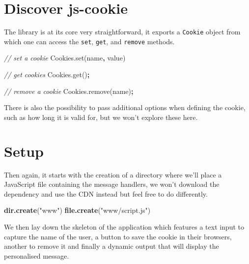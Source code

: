 \documentclass[
]{krantz}
\makeatletter
\newenvironment{Shaded}{\begin{snugshade}}{\end{snugshade}}
\newcommand{\AttributeTok}[1]{\textcolor[rgb]{0.61,0.61,0.61}{#1}}
\newcommand{\CommentTok}[1]{\textcolor[rgb]{0.37,0.37,0.37}{\textit{#1}}}
\newcommand{\KeywordTok}[1]{\textcolor[rgb]{0.27,0.27,0.27}{\textbf{#1}}}
\newcommand{\NormalTok}[1]{#1}
\newcommand{\OperatorTok}[1]{\textcolor[rgb]{0.43,0.43,0.43}{\textbf{#1}}}
\newcommand{\StringTok}[1]{\textcolor[rgb]{0.5,0.5,0.5}{#1}}
\newcommand{\VariableTok}[1]{\textcolor[rgb]{0,0,0}{#1}}
\newenvironment{kframe}{%
\medskip{}
\setlength{\fboxsep}{.8em}
 \def\at@end@of@kframe{}%
 \ifinner\ifhmode%
  \def\at@end@of@kframe{\end{minipage}}%
  \begin{minipage}{\columnwidth}%
 \fi\fi%
 \def\FrameCommand##1{\hskip\@totalleftmargin \hskip-\fboxsep
 \colorbox{shadecolor}{##1}\hskip-\fboxsep
     \hskip-\linewidth \hskip-\@totalleftmargin \hskip\columnwidth}%
 \MakeFramed {\advance\hsize-\width
   \@totalleftmargin\z@ \linewidth\hsize
   \@setminipage}}%
 {\par\unskip\endMakeFramed%
 \at@end@of@kframe}
\renewenvironment{Shaded}{\begin{kframe}}{\end{kframe}}
\makeatother
\begin{document}
\hypertarget{discover-js-cookie}{%
\section{Discover js-cookie}\label{discover-js-cookie}}

The library is at its core very straightforward, it exports a \texttt{Cookie} object from which one can access the \texttt{set}, \texttt{get}, and \texttt{remove} methods.

\begin{Shaded}
\begin{Highlighting}[]
\CommentTok{// set a cookie}
\VariableTok{Cookies}\NormalTok{.}\AttributeTok{set}\NormalTok{(}\StringTok{\textquotesingle{}name\textquotesingle{}}\OperatorTok{,} \StringTok{\textquotesingle{}value\textquotesingle{}}\NormalTok{)}

\CommentTok{// get cookies}
\VariableTok{Cookies}\NormalTok{.}\AttributeTok{get}\NormalTok{()}\OperatorTok{;}

\CommentTok{// remove a cookie}
\VariableTok{Cookies}\NormalTok{.}\AttributeTok{remove}\NormalTok{(}\StringTok{\textquotesingle{}name\textquotesingle{}}\NormalTok{)}\OperatorTok{;}
\end{Highlighting}
\end{Shaded}

There is also the possibility to pass additional options when defining the cookie, such as how long it is valid for, but we won't explore these here.

\hypertarget{setup}{%
\section{Setup}\label{setup}}

Then again, it starts with the creation of a directory where we'll place a JavaScript file containing the message handlers, we won't download the dependency and use the CDN instead but feel free to do differently.

\begin{Shaded}
\begin{Highlighting}[]
\KeywordTok{dir.create}\NormalTok{(}\StringTok{"www"}\NormalTok{)}
\KeywordTok{file.create}\NormalTok{(}\StringTok{"www/script.js"}\NormalTok{)}
\end{Highlighting}
\end{Shaded}

We then lay down the skeleton of the application which features a text input to capture the name of the user, a button to save the cookie in their browsers, another to remove it and finally a dynamic output that will display the personalised message.
\end{document}
